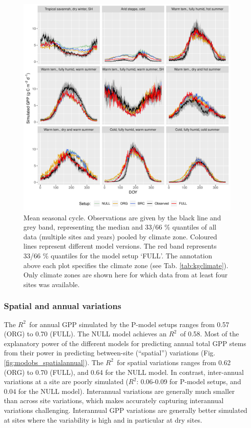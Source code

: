 \documentclass{myreport}
\newcommand{\rsq}{$R^2$}
\begin{document}
 \begin{figure}[!ht]
\includegraphics[width=\textwidth]{fig/meandoy_byzone.pdf}
\caption{Mean seasonal cycle. Observations are given by the black line and grey band, representing the median and 33/66 \% quantiles of all data (multiple sites and years) pooled by climate zone. Coloured lines represent different model versions. The red band represents 33/66 \% quantiles for the model setup `FULL'. The annotation above each plot specifies the climate zone (see Tab. \ref{tab:kgclimate}). Only climate zones are shown here for which data from at least four sites was available.}
    \label{fig:season}
\end{figure}

\clearpage

\subsubsection{Spatial and annual variations}

The \rsq\ for annual GPP simulated by the P-model setups ranges from 0.57 (ORG) to 0.70 (FULL). The NULL model achieves an \rsq\ of 0.58. Most of the explanatory power of the different models for predicting annual total GPP stems from their power in predicting between-site (``spatial'') variations (Fig. \ref{fig:modobs_spatialannual}). The \rsq\ for spatial variations ranges from 0.62 (ORG) to 0.70 (FULL), and 0.64 for the NULL model. In contrast, inter-annual  variations at a site are poorly simulated (\rsq : 0.06-0.09 for P-model setups, and 0.04 for the NULL model). Interannual variations are generally much smaller than across site variations, which makes accurately capturing interannual variations challenging. Interannual GPP variations are generally better simulated at sites where the variability is high and in particular at dry sites. 
\end{document}
